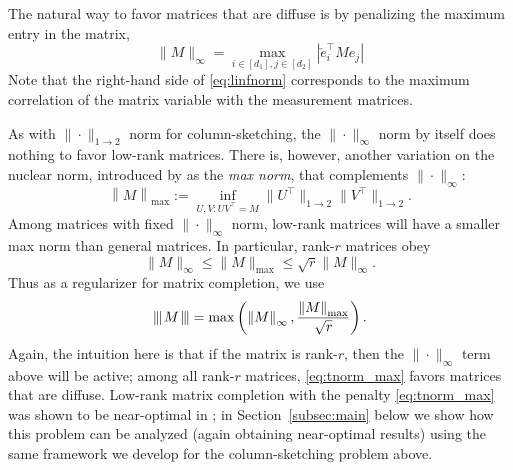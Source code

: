 \documentclass[11pt]{article}
\newcommand{\xspace}{\hbox{\kern-2.5pt}}
\newcommand\tnorm[1]{\left\vert\xspace\left\vert\xspace\left\vert\mskip2mu
#1\mskip2mu \right\vert\xspace\right\vert\xspace\right\vert}
\newcommand{\norm}[1]{\left \|#1 \right \|}
\begin{document}
The natural way to favor matrices that are diffuse is by penalizing the maximum entry in the matrix,
\begin{equation}
	\label{eq:linfnorm}
	\|M\|_\infty = \max_{i \in [d_1], j \in [d_2]} | \check{e}_i^\top M e_j|
\end{equation}
Note that the right-hand side of \eqref{eq:linfnorm} corresponds to the maximum correlation of the matrix variable with the measurement matrices.

As with $\|\cdot\|_{1\rightarrow 2}$ norm for column-sketching, the $\|\cdot\|_\infty$ norm by itself does nothing to favor low-rank matrices.  There is, however, another variation on the nuclear norm, introduced by \citep{linial2007complexity} as the \emph{max norm}, that complements $\|\cdot\|_\infty$:
\begin{equation}
	\label{eq:def_max_norm}
	\norm{M}_\mathrm{max} := \inf_{U,V : U V^\top = M} \|U^\top\|_{1 \to 2} \|V^\top\|_{1\to 2}.
\end{equation}
Among matrices with fixed $\|\cdot\|_\infty$ norm, low-rank matrices will have a smaller max norm than general matrices.  In particular, rank-$r$ matrices obey
\[
	\|M\|_\infty\leq \|M\|_\mathrm{max}\leq \sqrt{r}\|M\|_\infty.
\]
Thus as a regularizer for matrix completion, we use
\begin{equation}
	\label{eq:tnorm_max}
	\tnorm{M} = \max\left( \norm{M}_{\infty}, \frac{\norm{M}_\mathrm{max}}{\sqrt{r}} \right).
\end{equation}
Again, the intuition here is that if the matrix is rank-$r$, then the $\|\cdot\|_\infty$ term above will be active; among all rank-$r$ matrices, \eqref{eq:tnorm_max} favors matrices that are diffuse.  Low-rank matrix completion with the penalty \eqref{eq:tnorm_max} was shown to be near-optimal in \cite{cai2016matrix}; in Section~\ref{subsec:main} below we show how this problem can be analyzed (again obtaining near-optimal results) using the same framework we develop for the column-sketching problem above.
\end{document}
